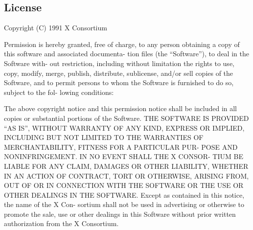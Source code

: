 \documentclass{article}
\begin{document}
\begin{appendix}
\section{License}
\begin{center}
	      Copyright (C) 1991 X Consortium
\end{center}
Permission is hereby granted, free of charge, to any person
obtaining a copy of this software and associated documenta-
tion files (the ``Software''), to deal in the Software with-
out restriction, including without limitation the rights to
use, copy, modify, merge, publish, distribute, sublicense,
and/or sell copies of the Software, and to permit persons to
whom the Software is furnished to do so, subject to the fol-
lowing conditions:

The above copyright notice and this permission notice shall
be included in all copies or substantial portions of the
Software.
THE SOFTWARE IS PROVIDED ``AS IS'', WITHOUT WARRANTY OF ANY
KIND, EXPRESS OR IMPLIED, INCLUDING BUT NOT LIMITED TO THE
WARRANTIES OF MERCHANTABILITY, FITNESS FOR A PARTICULAR PUR-
POSE AND NONINFRINGEMENT.  IN NO EVENT SHALL THE X CONSOR-
TIUM BE LIABLE FOR ANY CLAIM, DAMAGES OR OTHER LIABILITY,
WHETHER IN AN ACTION OF CONTRACT, TORT OR OTHERWISE, ARISING
FROM, OUT OF OR IN CONNECTION WITH THE SOFTWARE OR THE USE
OR OTHER DEALINGS IN THE SOFTWARE.
Except as contained in this notice, the name of the X Con-
sortium shall not be used in advertising or otherwise to
promote the sale, use or other dealings in this Software
without prior written authorization from the X Consortium.
\end{appendix}
\end{document}
